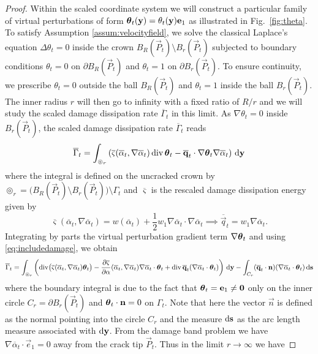 \begin{proof}
Within the scaled coordinate system we will construct a particular family of virtual perturbations of form $\vtheta_t(\vec{y})=\theta_t(\vec{y})\vec{e}_1$ as illustrated in Fig.~\ref{fig:theta}. To satisfy Assumption \ref{assum:velocityfield}, we solve the classical Laplace's equation $\Delta\theta_t=0$ inside the crown $B_R(\vec{P}_t)\setminus B_r(\vec{P}_t)$ subjected to boundary conditions $\theta_t=0$ on $\partial B_R(\vec{P}_t)$ and $\theta_t=1$ on $\partial B_r(\vec{P}_t)$. To ensure continuity, we prescribe $\theta_t=0$ outside the ball $B_R(\vec{P}_t)$ and $\theta_t=1$ inside the ball $B_r(\vec{P}_t)$. The inner radius $r$ will then go to infinity with a fixed ratio of $R/r$ and we will study the scaled damage dissipation rate $\overline{\Gamma}_t$ in this limit. As $\nabla\theta_t=0$ inside $B_r(\vec{P}_t)$, the scaled damage dissipation rate $\overline{\Gamma}_t$ reads
\[
\overline{\Gamma}_t=\int_{\circledcirc_r}\left(\overline{\varsigma}(\overline{\alpha}_t,\nabla\overline{\alpha}_t)\div\vtheta_t-\overline{\vec{q}}_t\cdot\nabla\vtheta_t\nabla\overline{\alpha}_t\right)\D{\vec{y}}
\]
where the integral is defined on the uncracked crown by $\circledcirc_r=\bigl(B_R(\vec{P}_t)\setminus B_r(\vec{P}_t)\bigr)\setminus\Gamma_t$ and $\overline{\varsigma}$ is the rescaled damage dissipation energy given by
\[
\overline{\varsigma}(\overline{\alpha}_t,\nabla\overline{\alpha}_t)=w(\overline{\alpha}_t)+\frac{1}{2}w_1\nabla\overline{\alpha}_t\cdot\nabla\overline{\alpha}_t\implies\overline{\vec{q}}_t=w_1\nabla\overline{\alpha}_t.
\]
Integrating by parts the virtual perturbation gradient term $\nabla\vtheta_t$ and using \eqref{eq:includedamage}, we obtain
\[
\overline{\Gamma}_t=\int_{\circledcirc_r}\left(\div\bigl(\overline{\varsigma}(\overline{\alpha}_t,\nabla\overline{\alpha}_t)\vtheta_t\bigr)-\frac{\partial\overline{\varsigma}}{\partial\alpha}(\overline{\alpha}_t,\nabla\overline{\alpha}_t)\nabla\overline{\alpha}_t\cdot\vtheta_t+\div\overline{\vec{q}}_t(\nabla\overline{\alpha}_t\cdot\vtheta_t)\right)\D{\vec{y}}-\int_{C_r}(\overline{\vec{q}}_t\cdot\vec{n})(\nabla\overline{\alpha}_t\cdot\vtheta_t)\D{\vec{s}}
\]
where the boundary integral is due to the fact that $\vtheta_t=\vec{e}_1\neq\vec{0}$ only on the inner circle $C_r=\partial B_r(\vec{P}_t)$ and $\vtheta_t\cdot\vec{n}=0$ on $\Gamma_t$. Note that here the vector $\vec{n}$ is defined as the normal pointing into the circle $C_r$ and the measure $\md\vec{s}$ as the arc length measure associated with $\md\vec{y}$. From the damage band problem we have $\nabla\overline{\alpha}_t\cdot\vec{e}_1=0$ away from the crack tip $\vec{P}_t$. Thus in the limit $r\to\infty$ we have

\end{proof}
